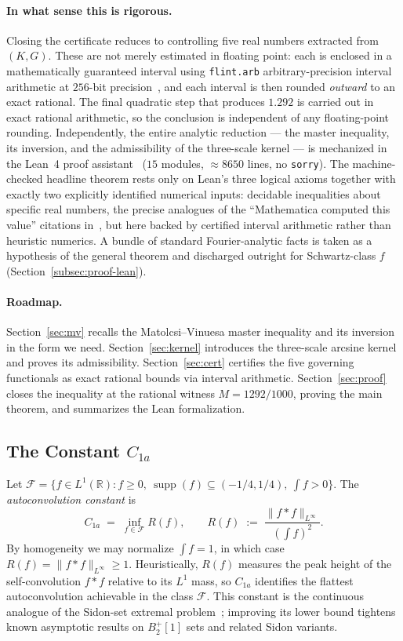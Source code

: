 \documentclass[11pt, letterpaper]{article}
\theoremstyle{paperplain}
\theoremstyle{paperdef}
\newcommand{\R}{\mathbb{R}}
\newcommand{\Linf}{L^\infty}
\newcommand{\supp}{\operatorname{supp}}
\begin{document}
\paragraph{In what sense this is rigorous.}
Closing the certificate reduces to controlling five real numbers
extracted from $(K,G)$.  These are not merely estimated in floating
point: each is enclosed in a mathematically guaranteed interval using
\texttt{flint.arb} arbitrary-precision interval arithmetic at $256$-bit
precision~\cite{Flint}, and each interval is then rounded
\emph{outward} to an exact rational.  The final quadratic step that
produces $1.292$ is carried out in exact rational arithmetic, so the
conclusion is independent of any floating-point rounding.
Independently, the entire analytic reduction --- the master
inequality, its inversion, and the admissibility of the three-scale
kernel --- is mechanized in the Lean~4 proof
assistant~\cite{Lean,Mathlib} ($15$ modules, $\approx 8650$ lines, no
\texttt{sorry}).  The machine-checked headline theorem rests only on
Lean's three logical axioms together with exactly two explicitly
identified numerical inputs: decidable inequalities about specific real
numbers, the precise analogues of the ``Mathematica computed this
value'' citations in~\cite{MV10}, but here backed by certified interval
arithmetic rather than heuristic numerics.  A bundle of standard
Fourier-analytic facts is taken as a hypothesis of the general theorem
and discharged outright for Schwartz-class $f$
(Section~\ref{subsec:proof-lean}).

\paragraph{Roadmap.}
Section~\ref{sec:mv} recalls the Matolcsi--Vinuesa master inequality
and its inversion in the form we need.
Section~\ref{sec:kernel} introduces the three-scale arcsine kernel and
proves its admissibility.  Section~\ref{sec:cert} certifies the five
governing functionals as exact rational bounds via interval
arithmetic.  Section~\ref{sec:proof} closes the inequality at the
rational witness $M=1292/1000$, proving the main theorem, and
summarizes the Lean formalization.

\subsection{The Constant \texorpdfstring{$C_{1a}$}{C1a}}\label{subsec:intro-constant}

Let $\mathcal{F}=\{f\in L^1(\R) : f\ge 0,\
\supp(f)\subseteq(-1/4,1/4),\ \int f>0\}$.  The
\emph{autoconvolution constant} is
\[
  C_{1a}
  \;=\;
  \inf_{f\in\mathcal{F}} R(f),
  \qquad
  R(f) \;:=\; \frac{\|f*f\|_{\Linf}}{\left(\int f\right)^2}.
\]
By homogeneity we may normalize $\int f=1$, in which case
$R(f)=\|f*f\|_{\Linf}\ge 1$.  Heuristically, $R(f)$ measures the
peak height of the self-convolution $f*f$ relative to its $L^1$
mass, so $C_{1a}$ identifies the flattest autoconvolution achievable
in the class $\mathcal{F}$.  This constant is the continuous
analogue of the Sidon-set extremal problem~\cite{ET41,MO2009};
improving its lower bound tightens known asymptotic results on
$B_2^{+}[1]$ sets and related Sidon variants.
\end{document}
